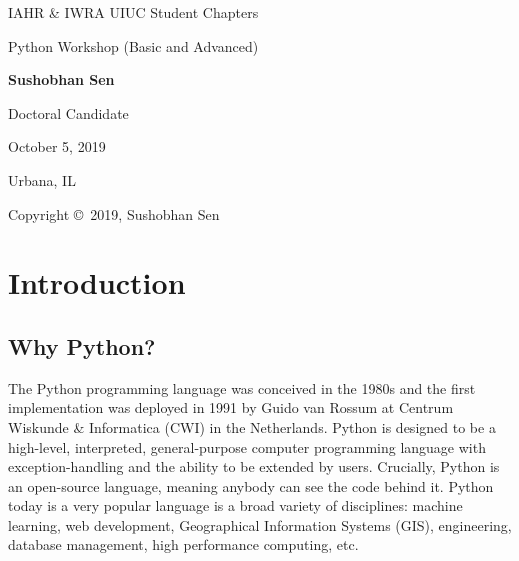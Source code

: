 \documentclass[12pt]{article}
\begin{document}
 
        

\begin{titlepage}
	\centering
	{\LARGE IAHR \& IWRA UIUC Student Chapters}
	\vspace{2cm}	
	
	\begin{Large}
	Python Workshop (Basic and Advanced)
	\vspace{1cm}
	
	\textbf{Sushobhan Sen}
	\vspace{1cm}
	
	Doctoral Candidate
	\vspace{1cm}
	
	October 5, 2019
	\vspace{1cm}
	
	Urbana, IL
	\end{Large}
\end{titlepage}

Copyright \copyright\ 2019, Sushobhan Sen

\doclicenseThis
\newpage

\tableofcontents
\newpage

\section{Introduction}
\subsection{Why Python?}
The Python programming language was conceived in the 1980s and the first implementation was deployed in 1991 by Guido van Rossum at Centrum Wiskunde \& Informatica (CWI) in the Netherlands. Python is designed to be a high-level, interpreted, general-purpose computer programming language with exception-handling and the ability to be extended by users. Crucially, Python is an open-source language, meaning anybody can see the code behind it. Python today is a very popular language is a broad variety of disciplines: machine learning, web development, Geographical Information Systems (GIS), engineering, database management, high performance computing, etc.
\end{document}
